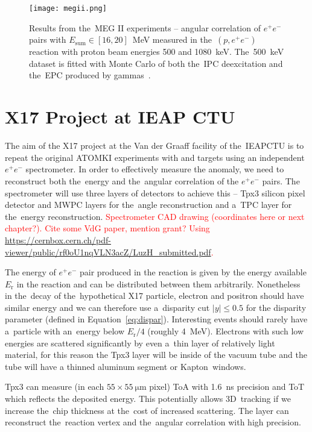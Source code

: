 				\begin{figure}
					\centering
					\texttt{[image: megii.png]}
					\caption{Results from the~MEG II experiments -- angular correlation of $e^+e^-$ pairs with $E_\text{sum} \in [16,20]$~MeV measured in the~$(p,e^+e^-)$ reaction with proton beam energies 500 and 1080~keV. The~500~keV dataset is fitted with Monte Carlo of both the~\ac{IPC} deexcitation and the~\ac{EPC} produced by gammas~\cite{megii}.}
					\label{fig:megii}
				\end{figure}
			
	
	\section{X17 Project at IEAP CTU}
	\label{sec:IEAP}
		The aim of the X17 project at the Van der Graaff facility of the~\acl{IEAPCTU} is to repeat the original ATOMKI experiments with  and  targets using an independent $e^+e^-$ spectrometer. In order to effectively measure the anomaly, we need to reconstruct both the~energy and the~angular correlation of the $e^+e^-$ pairs. The spectrometer will use three layers of detectors to achieve this -- \acf{Tpx3} silicon pixel detector and \acf{MWPC} layers for the~angle reconstruction and a~\acf{TPC} layer for the~energy reconstruction. \textcolor{red}{Spectrometer CAD drawing (coordinates here or next chapter?). Cite some VdG paper, mention grant? Using \url{https://cernbox.cern.ch/pdf-viewer/public/rf0oU1nqVLN3acZ/LuzH_submitted.pdf}.}
		
		The energy of $e^+e^-$ pair produced in the reaction is given by the energy available $E_\text{r}$ in the reaction and can be distributed between them arbitrarily. Nonetheless in the~decay of the~hypothetical X17 particle, electron and positron should have similar energy and we can therefore use a~disparity cut $|y| \leq 0.5$ for the disparity parameter (defined in Equation~\ref{eq:dispar}). Interesting events should rarely have a~particle with an~energy below $E_\text{r}/4$ (roughly 4~MeV). Electrons with such low energies are scattered significantly by even a~thin layer of relatively light material, for this reason the \ac{Tpx3} layer will be inside of the vacuum tube and the tube will have a thinned aluminum segment or Kapton\texttrademark\ windows.
		
		\ac{Tpx3} can measure (in each $55\times55~\mathrm{\mu m}$ pixel) \ac{ToA} with 1.6~ns precision and \ac{ToT} which reflects the deposited energy. This potentially allows 3D~tracking if we increase the~chip thickness at the~cost of increased scattering. The layer can reconstruct the~reaction vertex and the~angular correlation with high precision.
		
